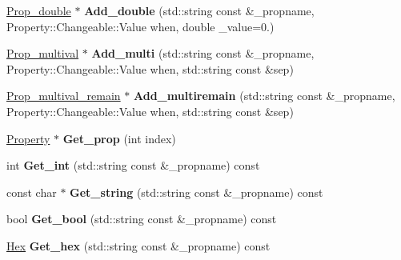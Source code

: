 \begin{DoxyCompactItemize}
\item 
\hypertarget{classSection__prop_a6424727658eb2b6ff12520af18c57f2a}{\hyperlink{classProp__double}{Prop\-\_\-double} $\ast$ {\bfseries Add\-\_\-double} (std\-::string const \&\-\_\-propname, Property\-::\-Changeable\-::\-Value when, double \-\_\-value=0.)}\label{classSection__prop_a6424727658eb2b6ff12520af18c57f2a}

\item 
\hypertarget{classSection__prop_a1f9676f80bdb10d68ca59f2e1c1b6fda}{\hyperlink{classProp__multival}{Prop\-\_\-multival} $\ast$ {\bfseries Add\-\_\-multi} (std\-::string const \&\-\_\-propname, Property\-::\-Changeable\-::\-Value when, std\-::string const \&sep)}\label{classSection__prop_a1f9676f80bdb10d68ca59f2e1c1b6fda}

\item 
\hypertarget{classSection__prop_a744b73ae840847ba44438a9252c0f5bd}{\hyperlink{classProp__multival__remain}{Prop\-\_\-multival\-\_\-remain} $\ast$ {\bfseries Add\-\_\-multiremain} (std\-::string const \&\-\_\-propname, Property\-::\-Changeable\-::\-Value when, std\-::string const \&sep)}\label{classSection__prop_a744b73ae840847ba44438a9252c0f5bd}

\item 
\hypertarget{classSection__prop_aa9e999eadf7c45031472722da954c7e6}{\hyperlink{classProperty}{Property} $\ast$ {\bfseries Get\-\_\-prop} (int index)}\label{classSection__prop_aa9e999eadf7c45031472722da954c7e6}

\item 
\hypertarget{classSection__prop_ab2f0390255ebba00eabae922b10666c0}{int {\bfseries Get\-\_\-int} (std\-::string const \&\-\_\-propname) const }\label{classSection__prop_ab2f0390255ebba00eabae922b10666c0}

\item 
\hypertarget{classSection__prop_aa73bf77c2da27f1b7eaaa2a7ae1a0956}{const char $\ast$ {\bfseries Get\-\_\-string} (std\-::string const \&\-\_\-propname) const }\label{classSection__prop_aa73bf77c2da27f1b7eaaa2a7ae1a0956}

\item 
\hypertarget{classSection__prop_aaeba2edf839ba6d0a3514865170c1c67}{bool {\bfseries Get\-\_\-bool} (std\-::string const \&\-\_\-propname) const }\label{classSection__prop_aaeba2edf839ba6d0a3514865170c1c67}

\item 
\hypertarget{classSection__prop_a27ea3faaa366883d57485239eca1fc48}{\hyperlink{classHex}{Hex} {\bfseries Get\-\_\-hex} (std\-::string const \&\-\_\-propname) const }\label{classSection__prop_a27ea3faaa366883d57485239eca1fc48}


\end{DoxyCompactItemize}

